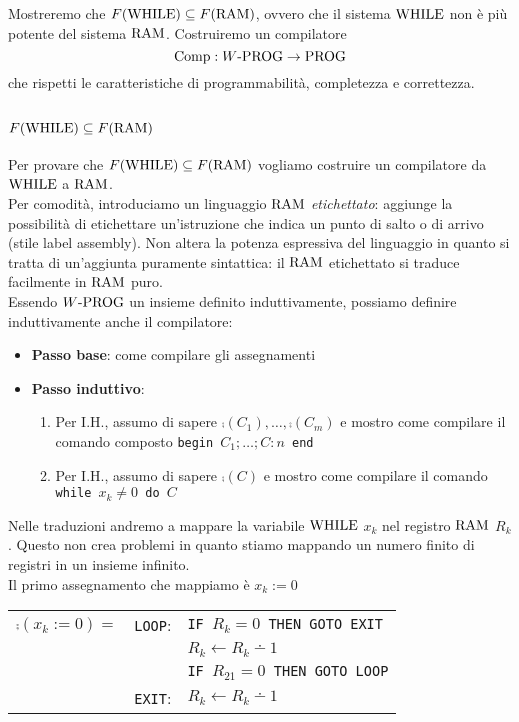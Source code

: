 Mostreremo che $F(\text{WHILE}) \subseteq F(\text{RAM})$, ovvero che il sistema $\text{WHILE}$ non è più potente del sistema $\text{RAM}$. Costruiremo un compilatore
$$ \text{Comp}: W\text{-PROG} \rightarrow \text{PROG} $$
che rispetti le caratteristiche di programmabilità, completezza e correttezza.\\

\subsection{$F(\text{WHILE}) \subseteq F(\text{RAM})$}

Per provare che $F(\text{WHILE}) \subseteq F(\text{RAM})$ vogliamo costruire un compilatore da $\text{WHILE}$ a $\text{RAM}$.\\

Per comodità, introduciamo un linguaggio $\text{RAM}$ \textit{etichettato}: aggiunge la possibilità di etichettare un'istruzione che indica un punto di salto o di arrivo (stile label assembly). Non altera la potenza espressiva del linguaggio in quanto si tratta di un'aggiunta puramente sintattica: il $\text{RAM}$ etichettato si traduce facilmente in $\text{RAM}$ puro.\\

Essendo $W\text{-PROG}$ un insieme definito induttivamente, possiamo definire induttivamente anche il compilatore:
\begin{itemize}
	\item \textbf{Passo base}: come compilare gli assegnamenti
	\item \textbf{Passo induttivo}:
	\begin{enumerate}
		\item Per I.H., assumo di sapere $\comp(C_1), \dots, \comp(C_m)$ e mostro come compilare il comando composto \texttt{begin $C_1; \dots; C:n$ end}
		\item Per I.H., assumo di sapere $\comp(C)$ e mostro come compilare il comando \texttt{while $x_k \neq 0$ do $C$}
	\end{enumerate}
\end{itemize}

Nelle traduzioni andremo a mappare la variabile $\text{WHILE}$ $x_k$ nel registro $\text{RAM}$ $R_k$. Questo non crea problemi in quanto stiamo mappando un numero finito di registri in un insieme infinito.\\

Il primo assegnamento che mappiamo è $x_k := 0$
\begin{center}
	\renewcommand{\arraystretch}{1.25}
	\begin{tabular}{l|r l|}
		\cline{2-3}
		$\comp(x_k:=0) =$ & \texttt{LOOP}:& \texttt{IF $R_k = 0$ THEN GOTO EXIT}\\
		&& $R_k\leftarrow R_k \dotminus 1$ \\
		&& \texttt{IF $R_{21} = 0$ THEN GOTO LOOP} \\
		&\texttt{EXIT}:& $R_k \leftarrow R_k \dotminus 1$ \\
		\cline{2-3}
	\end{tabular}\vspace{.15cm}
\end{center}

